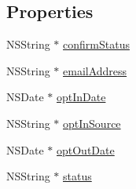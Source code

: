 \subsection*{Properties}
\begin{DoxyCompactItemize}
\item 
N\-S\-String $\ast$ \hyperlink{interface_email_address_aff92694cc4918ee4af67f9616520e75e}{confirm\-Status}
\item 
N\-S\-String $\ast$ \hyperlink{interface_email_address_affb38a74f6786b977661b59175bbd97c}{email\-Address}
\item 
N\-S\-Date $\ast$ \hyperlink{interface_email_address_a3bc52839a90b8a359b63938c7d07562a}{opt\-In\-Date}
\item 
N\-S\-String $\ast$ \hyperlink{interface_email_address_ad0d4ec3ee2087e6d87adb83d5f061326}{opt\-In\-Source}
\item 
N\-S\-Date $\ast$ \hyperlink{interface_email_address_abc600398b927212d6c16f8f7414cc7c1}{opt\-Out\-Date}
\item 
N\-S\-String $\ast$ \hyperlink{interface_email_address_a3e1b2bf02d88d5cac97fceafc0f9901e}{status}
\end{DoxyCompactItemize}


